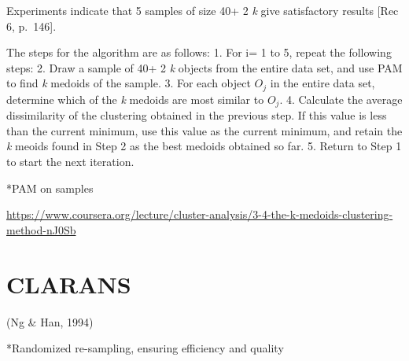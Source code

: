 \documentclass[12pt,twoside]{amherstthesis}
\begin{document}
  Experiments indicate that 5 samples of size 40+ 2 \emph{k} give
  satisfactory results {[}Rec 6, p.~146{]}.
  
  The steps for the algorithm are as follows: 1. For i= 1 to 5, repeat the
  following steps: 2. Draw a sample of 40+ 2 \emph{k} objects from the
  entire data set, and use PAM to find \emph{k} medoids of the sample. 3.
  For each object \(O_j\) in the entire data set, determine which of the
  \emph{k} medoids are most similar to \(O_j\). 4. Calculate the average
  dissimilarity of the clustering obtained in the previous step. If this
  value is less than the current minimum, use this value as the current
  minimum, and retain the \emph{k} meoids found in Step 2 as the best
  medoids obtained so far. 5. Return to Step 1 to start the next
  iteration.
  
  *PAM on samples
  
  \url{https://www.coursera.org/lecture/cluster-analysis/3-4-the-k-medoids-clustering-method-nJ0Sb}
  
  \section{CLARANS}\label{clarans}
  
  (Ng \& Han, 1994)
  
  *Randomized re-sampling, ensuring efficiency and quality
  
  \begin{Shaded}
  \begin{Highlighting}[]
  
  \NormalTok{(} \NormalTok{, }
         \NormalTok{, }
         \NormalTok{, } \NormalTok{, } \NormalTok{)}
  \end{Highlighting}
  \end{Shaded}
  
\end{document}
